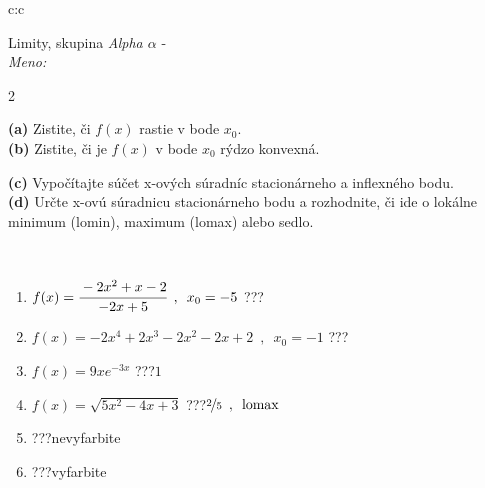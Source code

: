 \documentclass[10pt]{report}
\begin{document}
\thispagestyle{empty}
\begin{tabular}{c:c}
\begin{minipage}[c][104.5mm][t]{0.5\linewidth}
\begin{center}
\vspace{7mm}
{\huge Limity, skupina \textit{Alpha $\alpha$} -}\\[5mm]
\textit{Meno:}\phantom{xxxxxxxxxxxxxxxxxxxxxxxxxxxxxxxxxxxxxxxxxxxxxxxxxxxxxxxxxxxxxxxxx}\\[5mm]
\begin{minipage}{0.95\linewidth}
\begin{center}
{\small \begin{multicols}{2} \raggedright
\textbf{(a)} Zistite, či \(f(x)\) rastie v bode \(x_0\). \\[1mm]
\textbf{(b)} Zistite, či je \(f(x)\) v bode \(x_0\) rýdzo konvexná. \par \columnbreak
\textbf{(c)} Vypočítajte súčet x-ových súradníc stacionárneho a inflexného bodu. \\[1mm]
\textbf{(d)} Určte x-ovú súradnicu stacionárneho bodu a rozhodnite, či ide o lokálne minimum (lomin), maximum (lomax) alebo sedlo. \\[1mm]
\end{multicols}
}
\end{center}
\end{minipage}
\\[4mm]
\begin{minipage}{0.79\linewidth}
\begin{center}
\begin{varwidth}{\linewidth}
\begin{enumerate}
\normalsize
\item $f(x)=\cfrac{-2x^2+x-2}{-2x+5}\enspace , \enspace x_0=-5$\quad \dotfill\; ???\;\dotfill \quad {}
\item $f(x)=-2x^4+2x^3-2x^2-2x+2\enspace , \enspace x_0=-1$\quad \dotfill\; ???\;\dotfill \quad {}
\item $f(x)=9xe^{-3x}$\quad \dotfill\; ???\;\dotfill \quad $1$
\item $f(x)=\sqrt{5x^2-4x+3}$\quad \dotfill\; ???\;\dotfill \quad $\nicefrac{2}{5}\enspace , \enspace\text{lomax}$
\item \quad \dotfill\; ???\;\dotfill \quad nevyfarbite
\item \quad \dotfill\; ???\;\dotfill \quad vyfarbite
\end{enumerate}
\end{varwidth}

\end{center}
\end{minipage}
\end{center}
\end{minipage}
\end{tabular}
\end{document}
